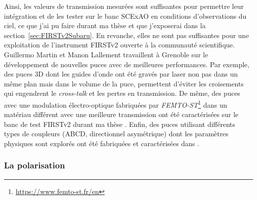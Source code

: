 Ainsi, les valeurs de transmission mesurées sont suffisantes pour permettre leur intégration et de les tester sur le banc \ac{SCExAO} en conditions d'observations du ciel, ce que j'ai pu faire durant ma thèse et que j'exposerai dans la section~\ref{sec:FIRSTv2Subaru}. En revanche, elles ne sont pas suffisantes pour une exploitation de l'instrument \ac{FIRSTv2} ouverte à la communauté scientifique. Guillermo Martin et Manon Lallement travaillent à Grenoble sur le développement de nouvelles puces avec de meilleures performances. Par exemple, des puces 3D \citep{martin2022a} dont les guides d'onde ont été gravés par laser non pas dans un même plan mais dans le volume de la puce, permettent d'éviter les croisements qui engendrent le \textit{cross-talk} et les pertes en transmission. De même, des puces avec une modulation électro-optique fabriquées par \textit{FEMTO-ST}\footnote{\url{https://www.femto-st.fr/en}} dans un matériau différent avec une meilleure transmission ont été caractérisées sur le banc de test \ac{FIRSTv2} durant ma thèse \citep{martin2022b}. Enfin, des puces utilisant différents types de coupleurs (ABCD, directionnel asymétrique) dont les paramètres physiques sont explorés ont été fabriquées et caractérisées dans \cite{lallement2022}.


\subsubsection{La polarisation}

